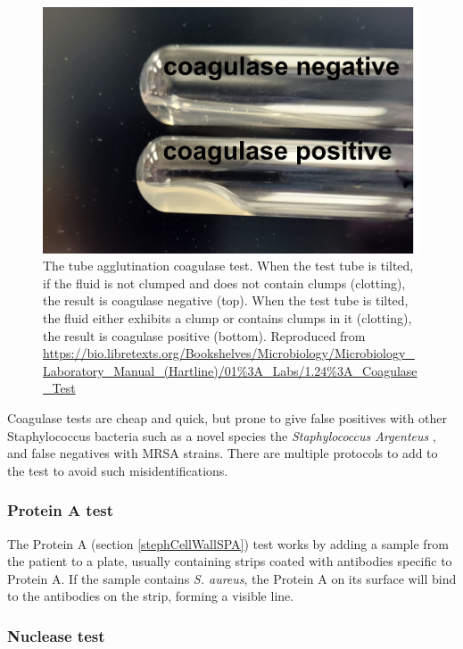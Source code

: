     \begin{figure}[h]
        \centering
            \includegraphics[width=0.7\linewidth]{figures/Staph/coagulase positive negative tube.png} 
        \caption{The tube agglutination coagulase test. When the test tube is tilted, if the fluid is not clumped and does not contain clumps (clotting), the result is coagulase negative (top). When the test tube is tilted, the fluid either exhibits a clump or contains clumps in it (clotting), the result is coagulase positive (bottom). Reproduced from \url{ https://bio.libretexts.org/Bookshelves/Microbiology/Microbiology\_Laboratory\_Manual\_(Hartline)/01\%3A\_Labs/1.24\%3A\_Coagulase_Test}}
        \label{figure:coagualaseTube}
    \end{figure}


Coagulase tests are cheap and quick, but prone to give false positives with other Staphylococcus bacteria such as a novel species the \textit{Staphylococcus Argenteus} \cite{staphArgentusCH}, and false negatives with MRSA strains. There are multiple protocols to add to the test to avoid such misidentifications. \cite{LibreTextStaphID}


\subsubsection{Protein A test}
\label{staph:SPAtest}

The Protein A (section \ref{stephCellWallSPA}) test works by adding a sample from the patient to a plate, usually containing strips coated with antibodies specific to Protein A. If the sample contains \textit{S. aureus}, the Protein A on its surface will bind to the antibodies on the strip, forming a visible line.

\subsubsection{Nuclease test}


